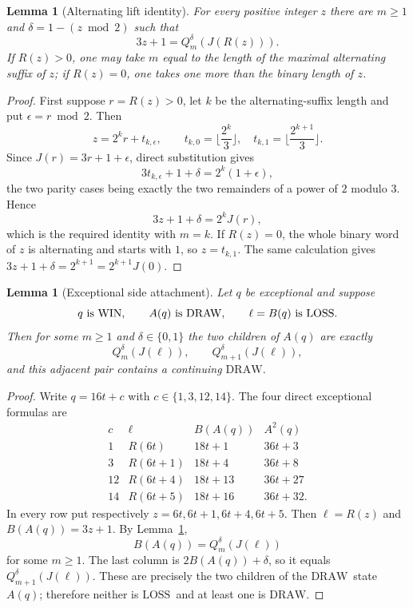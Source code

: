 \documentclass[11pt]{article}
\newtheorem{lemma}[theorem]{Lemma}
\newcommand{\WIN}{\ensuremath{\mathrm{WIN}}}
\newcommand{\LOSS}{\ensuremath{\mathrm{LOSS}}}
\newcommand{\DRAW}{\ensuremath{\mathrm{DRAW}}}
\begin{document}
\begin{lemma}[Alternating lift identity]\label{lem:alt-lift}
For every positive integer $z$ there are $m\ge1$ and
$\delta=1-(z\bmod2)$ such that
\[
  3z+1=Q_m^\delta(J(R(z))).
\]
If $R(z)>0$, one may take $m$ equal to the length of the maximal alternating
suffix of $z$; if $R(z)=0$, one takes one more than the binary length of $z$.
\end{lemma}

\begin{proof}
First suppose $r=R(z)>0$, let $k$ be the alternating-suffix length and put
$\epsilon=r\bmod2$. Then
\[
 z=2^k r+t_{k,\epsilon},\qquad
 t_{k,0}=\Big\lfloor\frac{2^k}{3}\Big\rfloor,
 \quad t_{k,1}=\Big\lfloor\frac{2^{k+1}}{3}\Big\rfloor.
\]
Since $J(r)=3r+1+\epsilon$, direct substitution gives
\[
 3t_{k,\epsilon}+1+\delta=2^k(1+\epsilon),
\]
the two parity cases being exactly the two remainders of a power of $2$
modulo $3$. Hence
\[
 3z+1+\delta=2^kJ(r),
\]
which is the required identity with $m=k$. If $R(z)=0$, the whole binary word
of $z$ is alternating and starts with $1$, so
$z=t_{k,1}$. The same calculation gives
$3z+1+\delta=2^{k+1}=2^{k+1}J(0)$.
\end{proof}

\begin{lemma}[Exceptional side attachment]\label{lem:exceptional-side}
Let $q$ be exceptional and suppose
\[
 q\text{ is \WIN},\qquad A(q)\text{ is \DRAW},\qquad
 \ell=B(q)\text{ is \LOSS}.
\]
Then for some $m\ge1$ and $\delta\in\{0,1\}$ the two children of $A(q)$ are
exactly
\[
  Q_m^\delta(J(\ell)),\qquad Q_{m+1}^\delta(J(\ell)),
\]
and this adjacent pair contains a continuing \DRAW.
\end{lemma}

\begin{proof}
Write $q=16t+c$ with $c\in\{1,3,12,14\}$. The four direct exceptional
formulas are
\[
\begin{array}{c|c|c|c}
c&\ell&B(A(q))&A^2(q)\\ \hline
1&R(6t)&18t+1&36t+3\\
3&R(6t+1)&18t+4&36t+8\\
12&R(6t+4)&18t+13&36t+27\\
14&R(6t+5)&18t+16&36t+32.
\end{array}
\]
In every row put respectively $z=6t,6t+1,6t+4,6t+5$. Then
$\ell=R(z)$ and $B(A(q))=3z+1$. By Lemma~\ref{lem:alt-lift},
\[
  B(A(q))=Q_m^\delta(J(\ell))
\]
for some $m\ge1$. The last column is $2B(A(q))+\delta$, so it equals
$Q_{m+1}^\delta(J(\ell))$. These are precisely the two children of the
\DRAW\ state $A(q)$; therefore neither is \LOSS\ and at least one is \DRAW.
\end{proof}
\end{document}
